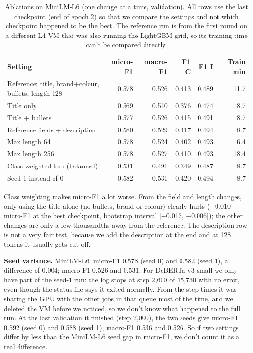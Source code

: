 \documentclass[11pt]{article}
\begin{document}
\begin{table}[H]\centering\small
\begin{tabular}{lrrrrr}\toprule
Setting & micro-F1 & macro-F1 & F1 C & F1 I & Train min \\\midrule
Reference: title, brand+colour, bullets; length 128 & 0.578 & 0.526 & 0.413 & 0.489 & 11.7 \\
Title only & 0.569 & 0.510 & 0.376 & 0.474 & 8.7 \\
Title + bullets & 0.577 & 0.526 & 0.415 & 0.491 & 8.7 \\
Reference fields + description & 0.580 & 0.529 & 0.417 & 0.494 & 8.7 \\
Max length 64 & 0.578 & 0.524 & 0.402 & 0.493 & 6.4 \\
Max length 256 & 0.578 & 0.527 & 0.410 & 0.493 & 18.4 \\
Class-weighted loss (balanced) & 0.531 & 0.491 & 0.349 & 0.487 & 8.7 \\
Seed 1 instead of 0 & 0.582 & 0.531 & 0.420 & 0.494 & 8.7 \\
\bottomrule\end{tabular}
\caption{Ablations on MiniLM-L6 (one change at a time, validation). All rows use the last checkpoint (end of epoch 2) so that we compare the settings and not which checkpoint happened to be the best. The reference run is from the first round on a different L4 VM that was also running the LightGBM grid, so its training time can't be compared directly.}\label{tab:abl}
\end{table}

Class weighting makes micro-F1 a lot worse. From the field and length changes, only using the title alone (no bullets, brand or colour) clearly hurts ($-0.010$ micro-F1 at the best checkpoint, bootstrap interval [$-$0.013, $-$0.006]); the other changes are only a few thousandths away from the reference. The description row is not a very fair test, because we add the description at the end and at 128 tokens it usually gets cut off.

\textbf{Seed variance.} MiniLM-L6: micro-F1 0.578 (seed 0) and 0.582 (seed 1), a difference of 0.004; macro-F1 0.526 and 0.531. For DeBERTa-v3-small we only have part of the seed-1 run: the log stops at step 2{,}600 of 15{,}730 with no error, even though the status file says it exited normally. From the step times it was sharing the GPU with the other jobs in that queue most of the time, and we deleted the VM before we noticed, so we don't know what happened to the full run. At the last validation it finished (step 2{,}000), the two seeds give micro-F1 0.592 (seed 0) and 0.588 (seed 1), macro-F1 0.536 and 0.526. So if two settings differ by less than the MiniLM-L6 seed gap in micro-F1, we don't count it as a real difference.
\end{document}
